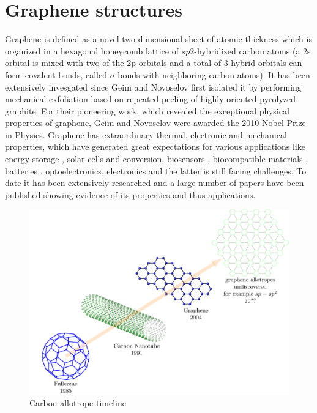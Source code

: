 \section{Graphene structures}
\vspace{-1cm}
Graphene is defined as a novel two-dimensional sheet of atomic thickness which is organized in a hexagonal honeycomb lattice of $sp2$-hybridized carbon atoms (a 2s orbital is mixed with two of the 2p orbitals and a total of 3 hybrid orbitals can form covalent bonds, called $\sigma$ bonds with neighboring carbon atoms).  It has been extensively invesgated since Geim and Novoselov first isolated it by performing mechanical exfoliation based on repeated peeling of highly oriented pyrolyzed graphite. For their pioneering work, which revealed the exceptional physical properties of graphene, Geim and Novoselov were awarded the 2010 Nobel Prize in Physics. 
Graphene has extraordinary thermal, electronic and mechanical properties, which have generated great expectations for various applications like  energy storage , solar cells \cite{singh2015graphene} and conversion, biosensors \cite{yang2015graphene,shao2010graphene}, biocompatible materials \cite{pinto2013graphene}, batteries \cite{kucinskis2013graphene}, optoelectronics, electronics \cite{schwierz2010graphene,chee2016flexible,li2012review} and the latter is still facing challenges\cite{mullen2017polyphenylenes}.  To date it has been extensively researched and a large number of papers have been published showing evidence of its properties and thus applications. 
\begin{figure}
	\centering
	\includegraphics[width=0.8\linewidth]{FIGURES/Introduction/Intro_Fig3/Intro_Fig3}
	\caption{Carbon allotrope timeline}
	\label{fig:introfig32}
\end{figure}
\\
